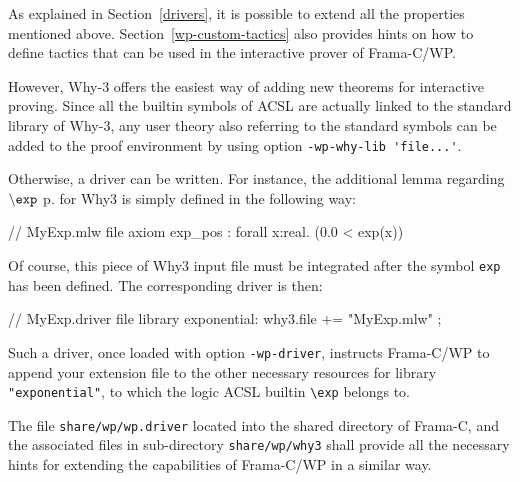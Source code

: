 As explained in Section~\ref{drivers}, it is possible to extend all the properties mentioned
above. Section~\ref{wp-custom-tactics} also provides hints on how to define tactics that can be
used in the interactive prover of \textsf{Frama-C/WP}.

However, \textsf{Why-3} offers the easiest way of adding new theorems for interactive proving.
Since all the builtin symbols of \textsf{ACSL} are actually linked to the standard library
of \textsf{Why-3}, any user theory also referring to the standard symbols can be added to the proof
environment by using option \verb+-wp-why-lib 'file...'+.

Otherwise, a driver can be written. For instance, the additional lemma regarding $\mathtt{\backslash exp}$
p.\pageref{builtin-hyperbolic} for \textsf{Why3} is simply defined in the following way:

\begin{logs}
    // MyExp.mlw file
    axiom exp_pos : forall x:real. (0.0 <  exp(x))
\end{logs}

Of course, this piece of \textsf{Why3} input file must be integrated after the symbol
\verb+exp+ has been defined. The corresponding driver is then:

\begin{logs}
    // MyExp.driver file
    library exponential:
    why3.file += "MyExp.mlw" ;
\end{logs}

Such a driver, once loaded with option \verb+-wp-driver+, instructs \textsf{Frama-C/WP} to
append your extension file to the other necessary resources for library \verb+"exponential"+, to
which the logic ACSL builtin \verb+\exp+ belongs to.

The file \verb+share/wp/wp.driver+ located into the shared directory of \textsf{Frama-C},
and the associated files in sub-directory \verb+share/wp/why3+ shall provide
all the necessary hints for extending the capabilities of \textsf{Frama-C/WP} in a similar way.
